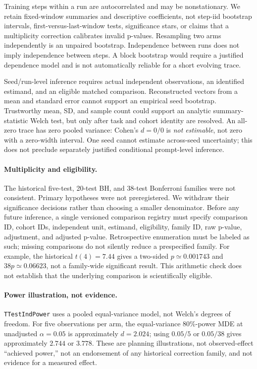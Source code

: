 Training steps within a run are autocorrelated and may be nonstationary. We
retain fixed-window summaries and descriptive coefficients, not step-iid
bootstrap intervals, first-versus-last-window tests, significance stars, or
claims that a multiplicity correction calibrates invalid p-values. Resampling
two arms independently is an unpaired bootstrap. Independence between runs does
not imply independence between steps. A block bootstrap would require a justified
dependence model and is not automatically reliable for a short evolving trace.

Seed/run-level inference requires actual independent observations, an identified
estimand, and an eligible matched comparison. Reconstructed vectors from a mean
and standard error cannot support an empirical seed bootstrap. Trustworthy mean,
SD, and sample count could support an analytic summary-statistic Welch test,
but only after task and cohort identity are resolved. An all-zero trace has
zero pooled variance: Cohen's $d=0/0$ is \emph{not estimable}, not zero with a
zero-width interval. One seed cannot estimate across-seed uncertainty; this does
not preclude separately justified conditional prompt-level inference.

\paragraph{Multiplicity and eligibility.}
The historical five-test, 20-test BH, and 38-test Bonferroni families were not
consistent. Primary hypotheses were not preregistered. We withdraw their
significance decisions rather than choosing a smaller denominator. Before any
future inference, a single versioned comparison registry must specify comparison
ID, cohort IDs, independent unit, estimand, eligibility, family ID, raw p-value,
adjustment, and adjusted p-value. Retrospective enumeration must be labeled as
such; missing comparisons do not silently reduce a prespecified family.
For example, the historical $t(4)=7.44$ gives a two-sided $p\simeq0.001743$ and
$38p\simeq0.06623$, not a family-wide significant result. This arithmetic check
does not establish that the underlying comparison is scientifically eligible.

\paragraph{Power illustration, not evidence.}
\texttt{TTestIndPower} uses a pooled equal-variance model, not Welch's degrees
of freedom. For five observations per arm, the equal-variance 80\%-power MDE
at unadjusted $\alpha=0.05$ is approximately $d=2.024$; using $0.05/5$ or
$0.05/38$ gives approximately $2.744$ or $3.778$. These are planning
illustrations, not observed-effect ``achieved power,'' not an endorsement of
any historical correction family, and not evidence for a measured effect.


